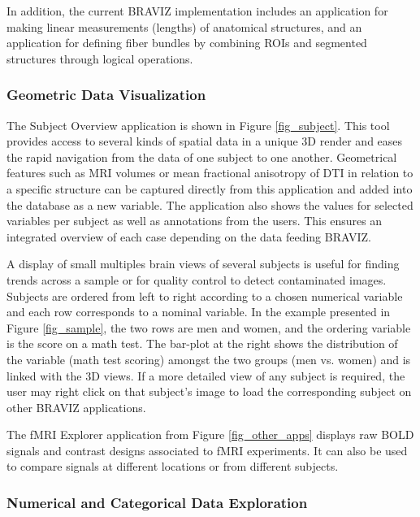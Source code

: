 \documentclass[twocolumn]{svjour3}
\begin{document}
In addition, the current BRAVIZ implementation includes an application for making linear measurements (lengths) of anatomical structures, and an application for defining fiber bundles by combining ROIs and segmented structures through logical operations.


\subsubsection{Geometric Data Visualization}

The Subject Overview application is shown in Figure \ref{fig_subject}. This tool  provides access to several kinds of spatial data in a unique 3D render and eases the rapid navigation from the data of one subject to one another. Geometrical features such as MRI volumes or mean fractional anisotropy of DTI in relation to a specific structure can be captured directly from this application and added into the database as a new variable. The application also shows the values for selected variables per subject as well as annotations from the users. This ensures an integrated overview of each case depending on the data feeding BRAVIZ.

A display of small multiples \cite{tufte_visual_1983}  brain views  of several subjects is useful for finding trends across a sample or for quality control to detect contaminated images. Subjects are ordered from left to right according to a chosen numerical variable and each row corresponds to a nominal variable. In the example presented in Figure \ref{fig_sample}, the two rows are men and women, and the ordering variable is the score on a math test. The bar-plot at the right shows the distribution of the variable (math test scoring) amongst the two groups (men vs. women) and is linked with the 3D views. If a more detailed view of any subject is required, the user may right click on that subject’s image to load the corresponding subject on other BRAVIZ applications.

The fMRI Explorer application from Figure \ref{fig_other_apps} displays raw BOLD signals and contrast designs associated to fMRI experiments. It can also be used to compare signals at different locations or from different subjects.

\subsubsection{Numerical and Categorical Data Exploration}
\end{document}
